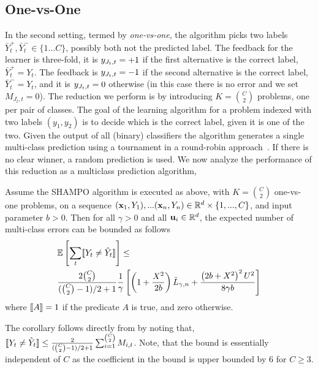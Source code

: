 \subsection{One-vs-One}
\label{sec:variants}
In the second setting, termed by {\em one-vs-one}, the algorithm picks two labels $\bar{Y}^+_t,\bar{Y}^-_t \in\{1 \dots C\}$, possibly both not the predicted label. The feedback for the learner is three-fold, it is $y_{J_t,t}=+1$ if the first alternative is the correct label, $\bar{Y}^+_t=Y_t$. The feedback is $y_{J_t,t}=-1$ if the second alternative is the correct label, $\bar{Y}^-_t=Y_t$, and it is $y_{J_t,t}=0$ otherwise (in this case there is no error and we set $M_{J_t,t}=0$). The reduction we perform is by introducing $K= {C \choose 2}$ problems, one per pair of classes.  The goal of the learning algorithm for a problem indexed with two labels $(y_1,y_2)$ is to decide which is the correct label, given it is one of the two. Given the output of all (binary) classifiers the algorithm generates a single multi-class prediction using a tournament in a round-robin approach~\cite{DBLP:journals/jmlr/Furnkranz02}. If there is no clear winner, a random prediction is used. We now analyze the performance of this reduction as a multiclass prediction algorithm,
\begin{corollary} 
Assume the SHAMPO algorithm is executed as above, with $K={C \choose 2}$ one-vs-one problems, on a sequence $(\mathbf{x}_1,Y_1),...(\mathbf{x}_n,Y_n)\in\mathbb{R}^d\times\{1,...,C\}$, and input parameter $b>0$. Then for all $\gamma>0$ and all $\mathbf{u}_{i}\in\mathbb{R}^d$, the expected number of multi-class errors can be bounded as follows
\[
\begin{split}
&\mathbb{E}\left[{\sum_t [\![{Y_t \neq \hat{Y}_t}]\!]}\right]\le \\
&\frac{2{C \choose 2}}{({C \choose 2}-1)/2+1} \frac{1}{\gamma}\left[{\left({1+\frac{X^2}{2b} }\right){\bar L}_{\gamma,n}+\frac{\left({{2b+X^2}}\right)^2U^{2}}{8{\gamma}b}}\right]
\end{split}
\]
where $[\![{A}]\!]=1$ if the predicate $A$ is true, and zero otherwise.
\end{corollary}
The corollary follows directly from  by noting that, $[\![{Y_t \neq \hat{Y}_t}]\!] \leq \frac{2}{({C \choose 2}-1)/2+1}\sum_{i=1}^{ {C \choose 2}} M_{i,t}$. Note, that the bound is essentially  independent of $C$ as the coefficient in the bound is upper bounded by $6$ for $C \geq 3$.

